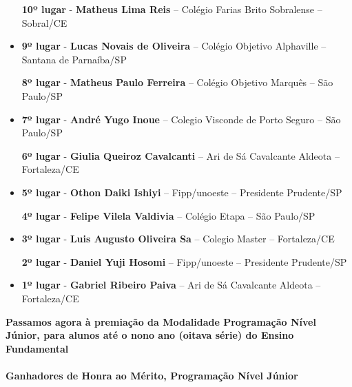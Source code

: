 \documentclass{article}
\begin{document}
\begin{itemize}
\textbf{10º lugar} - \textbf{Matheus Lima Reis} – Colégio Farias Brito Sobralense – Sobral/CE



\item
\textbf{9º lugar} - \textbf{Lucas Novais de Oliveira} – Colégio Objetivo Alphaville – Santana de Parnaíba/SP


\textbf{8º lugar} - \textbf{Matheus Paulo Ferreira} – Colégio Objetivo Marquês – São Paulo/SP



\item
\textbf{7º lugar} - \textbf{André Yugo Inoue} – Colegio Visconde de Porto Seguro – São Paulo/SP


\textbf{6º lugar} - \textbf{Giulia Queiroz Cavalcanti} – Ari de Sá Cavalcante Aldeota – Fortaleza/CE



\item
\textbf{5º lugar} - \textbf{Othon Daiki Ishiyi} – Fipp/unoeste – Presidente Prudente/SP


\textbf{4º lugar} - \textbf{Felipe Vilela Valdivia} – Colégio Etapa – São Paulo/SP



\item
\textbf{3º lugar} - \textbf{Luis Augusto Oliveira Sa} – Colegio Master – Fortaleza/CE


\textbf{2º lugar} - \textbf{Daniel Yuji Hosomi} – Fipp/unoeste – Presidente Prudente/SP



\item
\textbf{1º lugar} - \textbf{Gabriel Ribeiro Paiva} – Ari de Sá Cavalcante Aldeota – Fortaleza/CE



\end{itemize}

\color{blue}
\textbf{Passamos agora à premiação da Modalidade Programação Nível Júnior, para alunos até o nono ano (oitava série) do Ensino Fundamental}\\\\
\textbf{\color{blue}Ganhadores de Honra ao Mérito, \color{black}Programação Nível Júnior}
\color{black}
\end{document}
